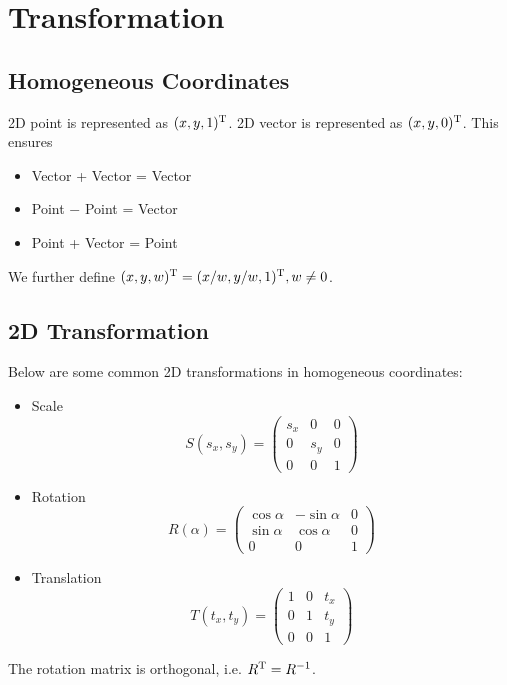 
% 



\section{Transformation}

\subsection{Homogeneous Coordinates}

2D point is represented as $(x, y, 1)^\mathrm{T}$. 2D vector is represented as $(x, y, 0)^\mathrm{T}$. This ensures

\begin{itemize}
    \item Vector + Vector = Vector
    \item Point $-$ Point = Vector
    \item Point + Vector = Point
\end{itemize}

We further define $(x, y, w)^\mathrm{T} = (x/w, y/w, 1)^\mathrm{T}, w\ne 0$.

\subsection{2D Transformation}

Below are some common 2D transformations in homogeneous coordinates:

\begin{itemize}
    \item Scale
    $$S(s_x, s_y) = \begin{pmatrix}
        s_x & 0 & 0 \\
        0 & s_y & 0 \\
        0 & 0 & 1
    \end{pmatrix}$$
    \item Rotation
    $$R(\alpha) = \begin{pmatrix}
        \cos\alpha & -\sin\alpha & 0 \\
        \sin\alpha & \cos\alpha & 0 \\
        0 & 0 & 1
    \end{pmatrix}$$
    \item Translation
    $$T(t_x, t_y) = \begin{pmatrix}
        1 & 0 & t_x \\
        0 & 1 & t_y \\
        0 & 0 & 1
    \end{pmatrix}$$
\end{itemize}

The rotation matrix is orthogonal, i.e. $R^\mathrm{T} = R^{-1}$.

% 
